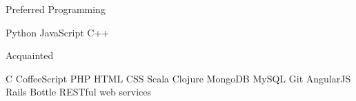\begin{cventries}
  \cventry
    {}
    {Preferred}
    {Programming}
    {}
    {
      \begin{cvitems}
        \item {Python \textbullet{}  JavaScript  \textbullet{}  C++}
      \end{cvitems}
    }
  \cventry
    {}
    {Acquainted}
    {}
    {}
    {
      \begin{cvitems}
      \item {C \textbullet{} CoffeeScript \textbullet{} PHP \textbullet{} HTML \textbullet{}  CSS \textbullet{} Scala \textbullet{} Clojure \textbullet{} MongoDB \textbullet{} MySQL \textbullet{} Git \textbullet{} AngularJS \textbullet{} Rails \textbullet{} Bottle \textbullet{} RESTful web services}
      \end{cvitems}
    }
    
\end{cventries}
